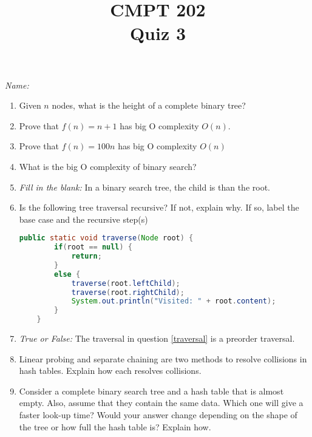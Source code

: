 \documentclass{article}
\title{CMPT 202\\Quiz 3}
\begin{document}
\maketitle
\emph{Name:}\\
\begin{enumerate}
	\item Given $n$ nodes, what is the  height of a complete binary tree?
	\item Prove that $f(n) = n + 1$ has big O complexity $O(n)$.
	\item Prove that $f(n) = 100n$ has big O complexity $O(n)$
	\item What is the big O complexity of binary search?
	\item \emph{Fill in the blank:} In a binary search tree, the
	\underline{\hspace{0.6in}}
	child is \underline{\hspace{0.6in}} than the root.
	\item \label{traversal} Is the following tree traversal recursive? If not, explain why.
	If so, label the base case and the recursive step(s)
	\begin{lstlisting}[language=Java]
	public static void traverse(Node root) {
		if(root == null) {
			return;
		}
		else {
			traverse(root.leftChild);
			traverse(root.rightChild);
			System.out.println("Visited: " + root.content);
		}
	}
	\end{lstlisting}
	\item \emph{True or False:} The traversal in question \ref{traversal}
	is a preorder traversal.
	\item Linear probing and separate chaining are two methods to resolve
	collisions in hash tables. Explain how each resolves collisions.
	\item Consider a complete binary search tree and a hash table that is
	almost empty. Also, assume that they contain the same data. Which one
	will give a faster look-up time? Would your answer change depending on
	the shape of the tree or how full the hash table is? Explain how.
\end{enumerate}
\end{document}
